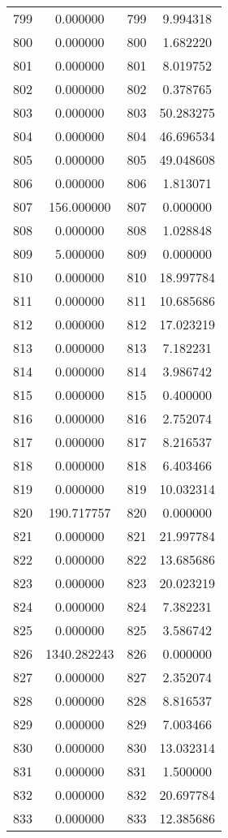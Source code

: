 \documentclass[12pt]{article}
\begin{document}
\begin{longtable}{@{}cccc@{}}
799 & 0.000000 & 799 & 9.994318 \\
800 & 0.000000 & 800 & 1.682220 \\
801 & 0.000000 & 801 & 8.019752 \\
802 & 0.000000 & 802 & 0.378765 \\
803 & 0.000000 & 803 & 50.283275 \\
804 & 0.000000 & 804 & 46.696534 \\
805 & 0.000000 & 805 & 49.048608 \\
806 & 0.000000 & 806 & 1.813071 \\
807 & 156.000000 & 807 & 0.000000 \\
808 & 0.000000 & 808 & 1.028848 \\
809 & 5.000000 & 809 & 0.000000 \\
810 & 0.000000 & 810 & 18.997784 \\
811 & 0.000000 & 811 & 10.685686 \\
812 & 0.000000 & 812 & 17.023219 \\
813 & 0.000000 & 813 & 7.182231 \\
814 & 0.000000 & 814 & 3.986742 \\
815 & 0.000000 & 815 & 0.400000 \\
816 & 0.000000 & 816 & 2.752074 \\
817 & 0.000000 & 817 & 8.216537 \\
818 & 0.000000 & 818 & 6.403466 \\
819 & 0.000000 & 819 & 10.032314 \\
820 & 190.717757 & 820 & 0.000000 \\
821 & 0.000000 & 821 & 21.997784 \\
822 & 0.000000 & 822 & 13.685686 \\
823 & 0.000000 & 823 & 20.023219 \\
824 & 0.000000 & 824 & 7.382231 \\
825 & 0.000000 & 825 & 3.586742 \\
826 & 1340.282243 & 826 & 0.000000 \\
827 & 0.000000 & 827 & 2.352074 \\
828 & 0.000000 & 828 & 8.816537 \\
829 & 0.000000 & 829 & 7.003466 \\
830 & 0.000000 & 830 & 13.032314 \\
831 & 0.000000 & 831 & 1.500000 \\
832 & 0.000000 & 832 & 20.697784 \\
833 & 0.000000 & 833 & 12.385686 \\

\end{longtable}
\end{document}
